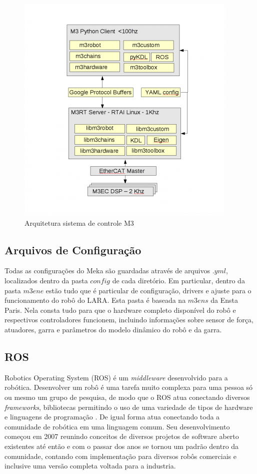 \begin{figure}[H]
    \centering
    \includegraphics[width=0.7\linewidth]{tex/figs/m3arch.png}
    \caption{Arquitetura sistema de controle M3 \cite{mekaguide}}
    \label{fig:m3arch}
\end{figure}

\subsection{Arquivos de Configuração}

Todas as configurações do Meka são guardadas através de arquivos $.yml$, localizados dentro da pasta $config$ de cada diretório. Em particular, dentro da pasta $m3ene$ estão tudo que é particular de configuração, drivers e ajuste para o funcionamento do robô do LARA. Esta pasta é baseada na $m3ens$ da Ensta Paris. Nela consta tudo para que o hardware completo disponível do robô e respectivos controladores funcionem, incluindo informações sobre sensor de força, atuadores, garra e parâmetros do modelo dinâmico do robô e da garra.

\subsection{ROS}

Robotics Operating System (ROS) é um \textit{middleware} desenvolvido para a robótica. Desenvolver um robô é uma tarefa muito complexa para uma pessoa só ou mesmo um grupo de pesquisa, de modo que o ROS atua conectando diversos \textit{frameworks}, bibliotecas permitindo o uso de uma variedade de tipos de hardware e linguagens de programação \cite{quigley2009ros}. De igual forma atua conectando toda a comunidade de robótica em uma linguagem comum. Seu desenvolvimento começou em 2007 reunindo conceitos de diversos projetos de software aberto existentes até então e com o passar dos anos se tornou um padrão dentro da comunidade, contando com implementação para diversos robôs comerciais e inclusive uma versão completa voltada para a industria.

